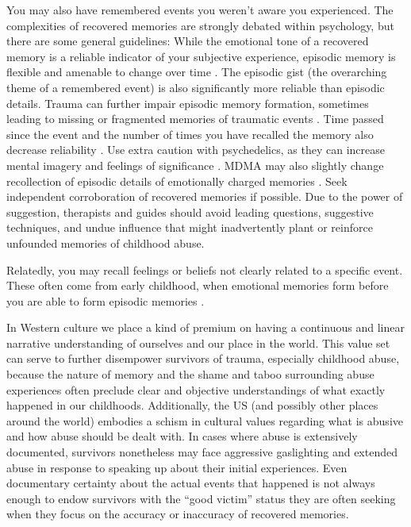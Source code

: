 \documentclass[12pt,letterpaper]{article}
\begin{document}
You may also have remembered events you weren't aware you experienced. The complexities of recovered memories are strongly debated within psychology, but there are some general guidelines: While the emotional tone of a recovered memory is a reliable indicator of your subjective experience, episodic memory is flexible and amenable to change over time \cite{reynaFuzzyTrace}. The episodic gist (the overarching theme of a remembered event) is also significantly more reliable than episodic details. Trauma can further impair episodic memory formation, sometimes leading to missing or fragmented memories of traumatic events \cite{vanderKolkBody}. Time passed since the event and the number of times you have recalled the memory also decrease reliability \cite{laneReconsolidation}. Use extra caution with psychedelics, as they can increase mental imagery and feelings of significance \cite{griffithsSignificance,araujoImagery}. MDMA may also slightly change recollection of episodic details of emotionally charged memories \cite{dossRecollection}. Seek independent corroboration of recovered memories if possible. Due to the power of suggestion, therapists and guides should avoid leading questions, suggestive techniques, and undue influence that might inadvertently plant or reinforce unfounded memories of childhood abuse.

Relatedly, you may recall feelings or beliefs not clearly related to a specific event. These often come from early childhood, when emotional memories form before you are able to form episodic memories \cite{brownAttachmentDisturbances}.

In Western  culture we place a kind of premium on having a continuous and linear narrative understanding of ourselves and our place in the world. This value set can serve to further disempower survivors of trauma, especially childhood abuse, because the nature of memory and the shame and taboo surrounding abuse experiences often preclude clear and objective understandings of what exactly happened in our childhoods.  Additionally, the US (and possibly other places around the world) embodies a schism in cultural values regarding what is abusive and how abuse should be dealt with. In cases where abuse is extensively documented, survivors nonetheless may face aggressive gaslighting and extended abuse in response to speaking up about their initial experiences. Even documentary certainty about the actual events that happened is not always enough to endow survivors with the “good victim” status they are often seeking when they focus on the accuracy or inaccuracy of recovered memories.
\end{document}
